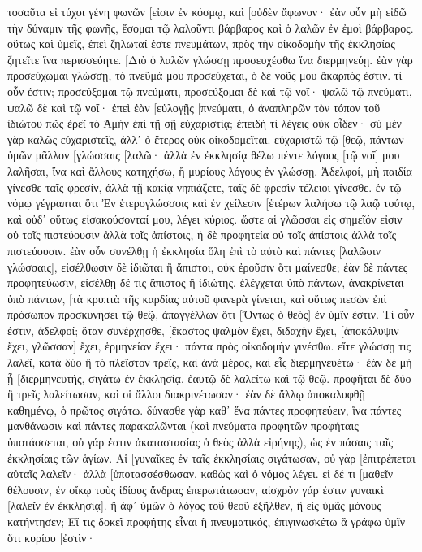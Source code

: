 τοσαῦτα εἰ τύχοι γένη φωνῶν [εἰσιν ἐν κόσμῳ, καὶ [οὐδὲν ἄφωνον· 
ἐὰν οὖν μὴ εἰδῶ τὴν δύναμιν τῆς φωνῆς, ἔσομαι τῷ λαλοῦντι βάρβαρος καὶ ὁ λαλῶν ἐν ἐμοὶ βάρβαρος. 
οὕτως καὶ ὑμεῖς, ἐπεὶ ζηλωταί ἐστε πνευμάτων, πρὸς τὴν οἰκοδομὴν τῆς ἐκκλησίας ζητεῖτε ἵνα περισσεύητε. 
[Διὸ ὁ λαλῶν γλώσσῃ προσευχέσθω ἵνα διερμηνεύῃ. 
ἐὰν γὰρ προσεύχωμαι γλώσσῃ, τὸ πνεῦμά μου προσεύχεται, ὁ δὲ νοῦς μου ἄκαρπός ἐστιν. 
τί οὖν ἐστιν; προσεύξομαι τῷ πνεύματι, προσεύξομαι δὲ καὶ τῷ νοΐ· ψαλῶ τῷ πνεύματι, ψαλῶ δὲ καὶ τῷ νοΐ· 
ἐπεὶ ἐὰν [εὐλογῇς [πνεύματι, ὁ ἀναπληρῶν τὸν τόπον τοῦ ἰδιώτου πῶς ἐρεῖ τὸ Ἀμήν ἐπὶ τῇ σῇ εὐχαριστίᾳ; ἐπειδὴ τί λέγεις οὐκ οἶδεν· 
σὺ μὲν γὰρ καλῶς εὐχαριστεῖς, ἀλλ᾽ ὁ ἕτερος οὐκ οἰκοδομεῖται. 
εὐχαριστῶ τῷ [θεῷ, πάντων ὑμῶν μᾶλλον [γλώσσαις [λαλῶ· 
ἀλλὰ ἐν ἐκκλησίᾳ θέλω πέντε λόγους [τῷ νοΐ] μου λαλῆσαι, ἵνα καὶ ἄλλους κατηχήσω, ἢ μυρίους λόγους ἐν γλώσσῃ. 
Ἀδελφοί, μὴ παιδία γίνεσθε ταῖς φρεσίν, ἀλλὰ τῇ κακίᾳ νηπιάζετε, ταῖς δὲ φρεσὶν τέλειοι γίνεσθε. 
ἐν τῷ νόμῳ γέγραπται ὅτι Ἐν ἑτερογλώσσοις καὶ ἐν χείλεσιν [ἑτέρων λαλήσω τῷ λαῷ τούτῳ, καὶ οὐδ᾽ οὕτως εἰσακούσονταί μου, λέγει κύριος. 
ὥστε αἱ γλῶσσαι εἰς σημεῖόν εἰσιν οὐ τοῖς πιστεύουσιν ἀλλὰ τοῖς ἀπίστοις, ἡ δὲ προφητεία οὐ τοῖς ἀπίστοις ἀλλὰ τοῖς πιστεύουσιν. 
ἐὰν οὖν συνέλθῃ ἡ ἐκκλησία ὅλη ἐπὶ τὸ αὐτὸ καὶ πάντες [λαλῶσιν γλώσσαις], εἰσέλθωσιν δὲ ἰδιῶται ἢ ἄπιστοι, οὐκ ἐροῦσιν ὅτι μαίνεσθε; 
ἐὰν δὲ πάντες προφητεύωσιν, εἰσέλθῃ δέ τις ἄπιστος ἢ ἰδιώτης, ἐλέγχεται ὑπὸ πάντων, ἀνακρίνεται ὑπὸ πάντων, 
[τὰ κρυπτὰ τῆς καρδίας αὐτοῦ φανερὰ γίνεται, καὶ οὕτως πεσὼν ἐπὶ πρόσωπον προσκυνήσει τῷ θεῷ, ἀπαγγέλλων ὅτι [Ὄντως ὁ θεὸς] ἐν ὑμῖν ἐστιν. 
Τί οὖν ἐστιν, ἀδελφοί; ὅταν συνέρχησθε, [ἕκαστος ψαλμὸν ἔχει, διδαχὴν ἔχει, [ἀποκάλυψιν ἔχει, γλῶσσαν] ἔχει, ἑρμηνείαν ἔχει· πάντα πρὸς οἰκοδομὴν γινέσθω. 
εἴτε γλώσσῃ τις λαλεῖ, κατὰ δύο ἢ τὸ πλεῖστον τρεῖς, καὶ ἀνὰ μέρος, καὶ εἷς διερμηνευέτω· 
ἐὰν δὲ μὴ ᾖ [διερμηνευτής, σιγάτω ἐν ἐκκλησίᾳ, ἑαυτῷ δὲ λαλείτω καὶ τῷ θεῷ. 
προφῆται δὲ δύο ἢ τρεῖς λαλείτωσαν, καὶ οἱ ἄλλοι διακρινέτωσαν· 
ἐὰν δὲ ἄλλῳ ἀποκαλυφθῇ καθημένῳ, ὁ πρῶτος σιγάτω. 
δύνασθε γὰρ καθ᾽ ἕνα πάντες προφητεύειν, ἵνα πάντες μανθάνωσιν καὶ πάντες παρακαλῶνται 
(καὶ πνεύματα προφητῶν προφήταις ὑποτάσσεται, 
οὐ γάρ ἐστιν ἀκαταστασίας ὁ θεὸς ἀλλὰ εἰρήνης), ὡς ἐν πάσαις ταῖς ἐκκλησίαις τῶν ἁγίων. 
Αἱ [γυναῖκες ἐν ταῖς ἐκκλησίαις σιγάτωσαν, οὐ γὰρ [ἐπιτρέπεται αὐταῖς λαλεῖν· ἀλλὰ [ὑποτασσέσθωσαν, καθὼς καὶ ὁ νόμος λέγει. 
εἰ δέ τι [μαθεῖν θέλουσιν, ἐν οἴκῳ τοὺς ἰδίους ἄνδρας ἐπερωτάτωσαν, αἰσχρὸν γάρ ἐστιν γυναικὶ [λαλεῖν ἐν ἐκκλησίᾳ]. 
ἢ ἀφ᾽ ὑμῶν ὁ λόγος τοῦ θεοῦ ἐξῆλθεν, ἢ εἰς ὑμᾶς μόνους κατήντησεν; 
Εἴ τις δοκεῖ προφήτης εἶναι ἢ πνευματικός, ἐπιγινωσκέτω ἃ γράφω ὑμῖν ὅτι κυρίου [ἐστὶν· 
